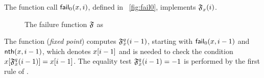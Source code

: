 
The function call
\(\textsf{fail}_0(x,i)\), defined in
\fig~\vref{fig:fail0}, implements \(\mathfrak{F}_{x}^{}(i)\).
\begin{figure}[t]
\abovedisplayskip=0pt
\belowdisplayskip=0pt
\caption{The failure function \(\mathfrak{F}\) as 
\label{fig:fail0}}
\end{figure}
The function  (\emph{fixed point})
computes \(\mathfrak{F}_{x}^{q}(i-1)\), starting with
\(\textsf{fail}_0(x,i-1)\) and
\(\textsf{nth}(x,i-1)\), which denotes
\({x}[{i-1}]\) and is needed to check the condition
\(\smash{{x}[{\mathfrak{F}_{x}^{q}(i-1)}]} = {x}[{i-1}]\). The
equality test \(\mathfrak{F}_{x}^{q}(i-1) = -1\) is performed by the first
rule of .

